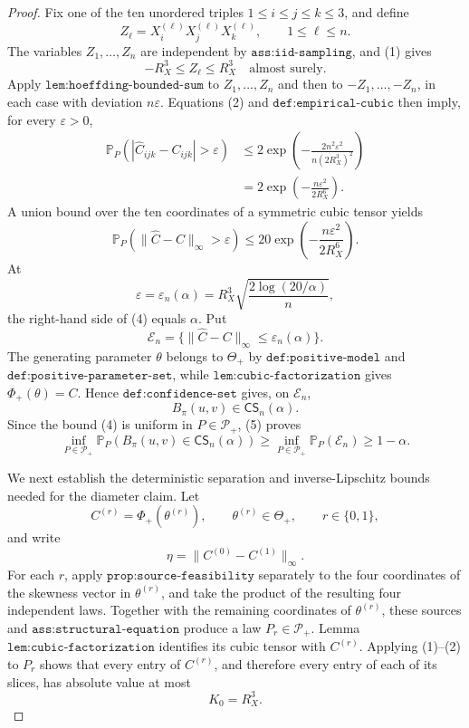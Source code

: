 \documentclass{article}
\begin{document}
\begin{proof}
Fix one of the ten unordered triples \(1\leq i\leq j\leq k\leq3\), and define
\[
 Z_\ell=X_i^{(\ell)}X_j^{(\ell)}X_k^{(\ell)},
 \qquad 1\leq\ell\leq n.
\]
The variables \(Z_1,\ldots,Z_n\) are independent by \(\texttt{ass:iid-sampling}\), and (1) gives
\[
 -R_X^3\leq Z_\ell\leq R_X^3
 \quad\text{almost surely}.
\]
Apply \(\texttt{lem:hoeffding-bounded-sum}\) to \(Z_1,\ldots,Z_n\) and then to \(-Z_1,\ldots,-Z_n\), in each case with deviation \(n\varepsilon\).  Equations (2) and \(\texttt{def:empirical-cubic}\) then imply, for every \(\varepsilon>0\),
\[
 \begin{aligned}
 \mathbb P_P\!\left(
   |\widehat C_{ijk}-C_{ijk}|>\varepsilon
 \right)
 &\leq
 2\exp\!\left(
 -\frac{2n^2\varepsilon^2}{n(2R_X^3)^2}
 \right)\\
 &=2\exp\!\left(-\frac{n\varepsilon^2}{2R_X^6}\right).
 \end{aligned}                                                     \tag{3}
\]
A union bound over the ten coordinates of a symmetric cubic tensor yields
\[
 \mathbb P_P\!\left(\|\widehat C-C\|_\infty>\varepsilon\right)
 \leq20\exp\!\left(-\frac{n\varepsilon^2}{2R_X^6}\right).        \tag{4}
\]
At
\[
 \varepsilon=\varepsilon_n(\alpha)
 =R_X^3\sqrt{\frac{2\log(20/\alpha)}{n}},
\]
the right-hand side of (4) equals \(\alpha\).  Put
\[
 \mathcal E_n
 =\{\|\widehat C-C\|_\infty\leq\varepsilon_n(\alpha)\}.
\]
The generating parameter \(\theta\) belongs to \(\Theta_+\) by \(\texttt{def:positive-model}\) and \(\texttt{def:positive-parameter-set}\), while \(\texttt{lem:cubic-factorization}\) gives \(\Phi_+(\theta)=C\).  Hence \(\texttt{def:confidence-set}\) gives, on \(\mathcal E_n\),
\[
 B_\pi(u,v)\in\mathsf{CS}_n(\alpha).                              \tag{5}
\]
Since the bound (4) is uniform in \(P\in\mathcal P_+\), (5) proves
\[
 \inf_{P\in\mathcal P_+}
 \mathbb P_P\!\left(B_\pi(u,v)\in\mathsf{CS}_n(\alpha)\right)
 \geq
 \inf_{P\in\mathcal P_+}\mathbb P_P(\mathcal E_n)
 \geq1-\alpha.                                                     \tag{6}
\]

We next establish the deterministic separation and inverse-Lipschitz bounds needed for the diameter claim.  Let
\[
 C^{(r)}=\Phi_+(\theta^{(r)}),
 \qquad \theta^{(r)}\in\Theta_+,
 \qquad r\in\{0,1\},
\]
and write
\[
 \eta=\|C^{(0)}-C^{(1)}\|_\infty.
\]
For each \(r\), apply \(\texttt{prop:source-feasibility}\) separately to the four coordinates of the skewness vector in \(\theta^{(r)}\), and take the product of the resulting four independent laws.  Together with the remaining coordinates of \(\theta^{(r)}\), these sources and \(\texttt{ass:structural-equation}\) produce a law \(P_r\in\mathcal P_+\).  Lemma \(\texttt{lem:cubic-factorization}\) identifies its cubic tensor with \(C^{(r)}\).  Applying (1)--(2) to \(P_r\) shows that every entry of \(C^{(r)}\), and therefore every entry of each of its slices, has absolute value at most
\[
 K_0=R_X^3.                                                        \tag{7}
\]


\end{proof}
\end{document}
